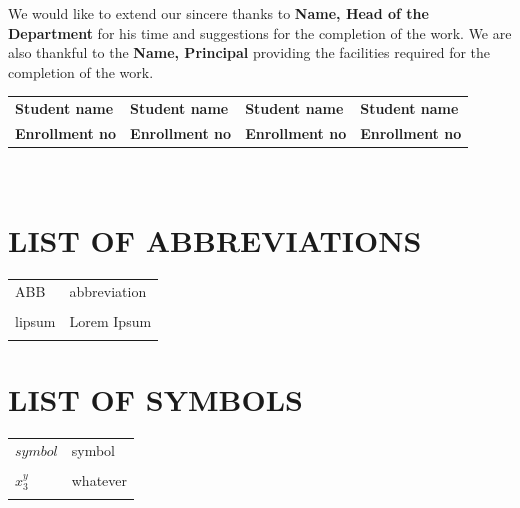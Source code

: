\documentclass{article}
\begin{document}
    We would like to extend our sincere thanks to \textbf{Name, Head of the Department} for his time and suggestions for the completion of the work. We are also thankful to the \textbf{Name, Principal} providing the facilities required for the completion of the work.\\[2cm]
    
    
    \noindent
    \begin{tabularx}{\textwidth}{X X X X}     
        \textbf{\small Student name} & \textbf{\small Student name} & \textbf{\small Student name} & \textbf{\small Student name} \\
        \textbf{\small Enrollment no} & \textbf{\small Enrollment no} & \textbf{\small Enrollment no} & \textbf{\small Enrollment no}
    \end{tabularx}\\[1cm]




\newpage







\chapter*{\centering \textbf{\Large LIST OF ABBREVIATIONS}}
    \begin{tabularx}{\textwidth}{X X}
            ABB & abbreviation\\\\
            lipsum &  Lorem Ipsum\\\\
    \end{tabularx}
    

\chapter*{\centering \textbf{\Large LIST OF SYMBOLS}}
    \begin{tabularx}{\textwidth}{X X}
            $symbol$ & symbol\\\\
            $x^y_3$ &  whatever\\\\
    \end{tabularx}
    
\end{document}

